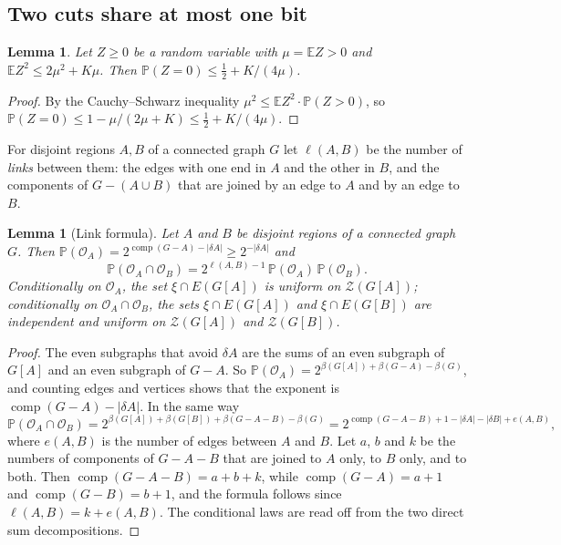 \documentclass[11pt]{article}
\newtheorem{lemma}[theorem]{Lemma}
\theoremstyle{definition}
\theoremstyle{remark}
\newcommand{\Z}{\mathcal{Z}}
\newcommand{\PP}{\mathbb{P}}
\newcommand{\EE}{\mathbb{E}}
\newcommand{\comp}{\operatorname{comp}}
\newcommand{\half}{\tfrac12}
\newcommand{\cO}{\mathcal{O}}
\begin{document}
\subsection{Two cuts share at most one bit}

\begin{lemma}\label{lem:second}
Let $Z\ge0$ be a random variable with $\mu=\EE Z>0$ and $\EE Z^{2}\le2\mu^{2}+K\mu$. Then
$\PP(Z=0)\le\half+K/(4\mu)$.
\end{lemma}

\begin{proof}
By the Cauchy--Schwarz inequality $\mu^{2}\le\EE Z^{2}\cdot\PP(Z>0)$, so
$\PP(Z=0)\le1-\mu/(2\mu+K)\le\half+K/(4\mu)$.
\end{proof}

For disjoint regions $A,B$ of a connected graph $G$ let $\ell(A,B)$ be the number of \emph{links}
between them: the edges with one end in $A$ and the other in $B$, and the components of
$G-(A\cup B)$ that are joined by an edge to $A$ and by an edge to $B$.

\begin{lemma}[Link formula]\label{lem:link}
Let $A$ and $B$ be disjoint regions of a connected graph $G$. Then
$\PP(\cO_A)=2^{\comp(G-A)-|\delta A|}\ge2^{-|\delta A|}$ and
\[
  \PP(\cO_A\cap\cO_B)=2^{\ell(A,B)-1}\,\PP(\cO_A)\,\PP(\cO_B).
\]
Conditionally on $\cO_A$, the set $\xi\cap E(G[A])$ is uniform on $\Z(G[A])$; conditionally on
$\cO_A\cap\cO_B$, the sets $\xi\cap E(G[A])$ and $\xi\cap E(G[B])$ are independent and uniform on
$\Z(G[A])$ and $\Z(G[B])$.
\end{lemma}

\begin{proof}
The even subgraphs that avoid $\delta A$ are the sums of an even subgraph of $G[A]$ and an even
subgraph of $G-A$. So $\PP(\cO_A)=2^{\beta(G[A])+\beta(G-A)-\beta(G)}$, and counting edges and
vertices shows that the exponent is $\comp(G-A)-|\delta A|$. In the same way
\[
  \PP(\cO_A\cap\cO_B)=2^{\beta(G[A])+\beta(G[B])+\beta(G-A-B)-\beta(G)}
     =2^{\comp(G-A-B)+1-|\delta A|-|\delta B|+e(A,B)},
\]
where $e(A,B)$ is the number of edges between $A$ and $B$. Let $a$, $b$ and $k$ be the numbers of
components of $G-A-B$ that are joined to $A$ only, to $B$ only, and to both. Then
$\comp(G-A-B)=a+b+k$, while $\comp(G-A)=a+1$ and $\comp(G-B)=b+1$, and the formula follows since
$\ell(A,B)=k+e(A,B)$. The conditional laws are read off from the two direct sum decompositions.
\end{proof}
\end{document}
